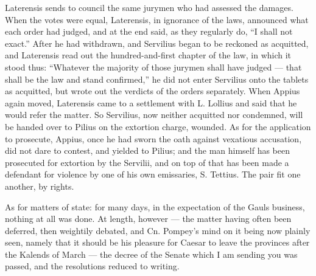 Laterensis sends to council the same jurymen who had assessed the damages. When the votes were equal, Laterensis, in ignorance of the laws, announced what each order had judged, and at the end said, as they regularly do, ``I shall not exact.'' After he had withdrawn, and Servilius began to be reckoned as acquitted, and Laterensis read out the hundred-and-first chapter of the law, in which it stood thus: ``Whatever the majority of those jurymen shall have judged --- that shall be the law and stand confirmed,'' he did not enter Servilius onto the tablets as acquitted, but wrote out the verdicts of the orders separately. When Appius again moved, Laterensis came to a settlement with L. Lollius and said that he would refer the matter. So Servilius, now neither acquitted nor condemned, will be handed over to Pilius on the extortion charge, wounded. As for the application to prosecute, Appius, once he had sworn the oath against vexatious accusation, did not dare to contest, and yielded to Pilius; and the man himself has been prosecuted for extortion by the Servilii, and on top of that has been made a defendant for violence by one of his own emissaries, S. Tettius. The pair fit one another, by rights.

 As for matters of state: for many days, in the expectation of the Gauls business, nothing at all was done. At length, however --- the matter having often been deferred, then weightily debated, and Cn. Pompey's mind on it being now plainly seen, namely that it should be his pleasure for Caesar to leave the provinces after the Kalends of March --- the decree of the Senate which I am sending you was passed, and the resolutions reduced to writing.


